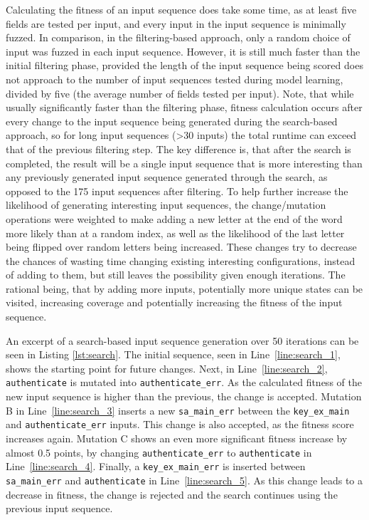 Calculating the fitness of an input sequence does take some time, as at least five fields are tested per input, and every input in the input sequence is minimally fuzzed. In comparison, in the filtering-based approach, only a random choice of input was fuzzed in each input sequence. However, it is still much faster than the initial filtering phase, provided the length of the input sequence being scored does not approach to the number of input sequences tested during model learning, divided by five (the average number of fields tested per input). Note, that while usually significantly faster than the filtering phase, fitness calculation occurs after every change to the input sequence being generated during the search-based approach, so for long input sequences (>30 inputs) the total runtime can exceed that of the previous filtering step. The key difference is, that after the search is completed, the result will be a single input sequence that is more interesting than any previously generated input sequence generated through the search, as opposed to the 175 input sequences after filtering. To help further increase the likelihood of generating interesting input sequences, the change/mutation operations were weighted to make adding a new letter at the end of the word more likely than at a random index, as well as the likelihood of the last letter being flipped over random letters being increased. These changes try to decrease the chances of wasting time changing existing interesting configurations, instead of adding to them, but still leaves the possibility given enough iterations. The rational being, that by adding more inputs, potentially more unique states can be visited, increasing coverage and potentially increasing the fitness of the input sequence. 

An excerpt of a search-based input sequence generation over 50 iterations can be seen in Listing \ref{lst:search}. 
The initial sequence, seen in Line~\ref{line:search_1}, shows the starting point for future changes. Next, in Line~\ref{line:search_2}, \texttt{authenticate} is mutated into \texttt{authenticate\_err}. As the calculated fitness of the new input sequence is higher than the previous, the change is accepted. Mutation B in Line~\ref{line:search_3} inserts a new \texttt{sa\_main\_err} between the \texttt{key\_ex\_main} and \texttt{authenticate\_err} inputs. This change is also accepted, as the fitness score increases again. Mutation C shows an even more significant fitness increase by almost 0.5 points, by changing \texttt{authenticate\_err} to \texttt{authenticate} in Line~\ref{line:search_4}. Finally, a \texttt{key\_ex\_main\_err} is inserted between \texttt{sa\_main\_err} and \texttt{authenticate} in Line~\ref{line:search_5}. As this change leads to a decrease in fitness, the change is rejected and the search continues using the previous input sequence.

